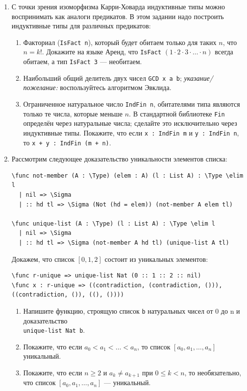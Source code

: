 \documentclass[10pt,a4paper,oneside]{article}
\begin{document}
\begin{enumerate}
\item С точки зрения изоморфизма Карри-Ховарда индуктивные типы можно воспринимать как аналоги предикатов.
В этом задании надо построить индуктивные типы для различных предикатов:
\begin{enumerate}
\item Факториал (\verb!IsFact n!), который будет обитаем только для таких $n$, что $n = k!$.
Докажите на языке Аренд, что \verb!IsFact! $(1 \cdot 2 \cdot 3 \cdot \dots \cdot n)$ всегда обитаем, а
тип \verb!IsFact 3! --- необитаем.
\item Наибольший общий делитель двух чисел \verb!GCD x a b!; \emph{указание/пожелание:} воспользуйтесь алгоритмом Эвклида.  
\item Ограниченное натуральное число \verb!IndFin n!, обитателями типа являются только те числа, которые меньше $n$.
В стандартной библиотеке \verb!Fin! определён через натуральные числа; 
сделайте это исключительно через индуктивные типы. Покажите, что если \verb!x : IndFin m! и \verb!y : IndFin n!,
то \verb!x + y : IndFin (m + n)!.
\end{enumerate}

\item Рассмотрим следующее доказательство уникальности элементов списка:
\begin{verbatim}
\func not-member (A : \Type) (elem : A) (l : List A) : \Type \elim l
  | nil => \Sigma
  | :: hd tl => \Sigma (Not (hd = elem)) (not-member A elem tl)

\func unique-list (A : \Type) (l : List A) : \Type \elim l
  | nil => \Sigma
  | :: hd tl => \Sigma (not-member A hd tl) (unique-list A tl)
\end{verbatim}

Докажем, что список $[0,1,2]$ состоит из уникальных элементов:
\begin{verbatim}
\func r-unique => unique-list Nat (0 :: 1 :: 2 :: nil)
\func x : r-unique => ((contradiction, (contradiction, ())), ((contradiction, ()), ((), ())))
\end{verbatim}

\begin{enumerate} 
\item Напишите функцию, строящую список \verb!b! натуральных чисел от 0 до n и доказательство\\ \verb!unique-list Nat b!.
\item Покажите, что если $a_0 < a_1 < \dots < a_n$, то список $[a_0,a_1,\dots,a_n]$ уникальный.
\item Покажите, что если $n \ge 2$ и $a_k \ne a_{k+1}$ при $0 \le k < n$, то необязательно, что список
$[a_0,a_1,\dots,a_n]$ --- уникальный.
\end{enumerate}


\end{enumerate}
\end{document}
